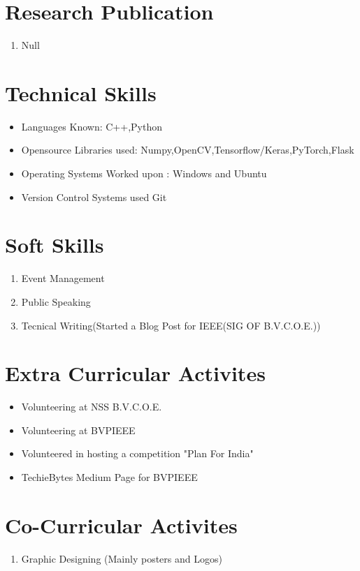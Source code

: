 \documentclass{my_cv}
\begin{document}
	\section{Research Publication}
	\begin{enumerate}
		\item Null
	\end{enumerate}
	\section{Technical Skills}
	\begin{itemize}
		\item Languages Known: C++,Python
		\item Opensource Libraries used: Numpy,OpenCV,Tensorflow/Keras,PyTorch,Flask
		\item Operating Systems Worked upon : Windows and Ubuntu
		\item Version Control Systems used Git
	\end{itemize}
	
	\section{Soft Skills}
	\begin{enumerate}
		\item Event Management
		\item Public Speaking
		\item Tecnical Writing(Started a Blog Post for IEEE(SIG OF B.V.C.O.E.))
	\end{enumerate}
	
	\section{Extra Curricular Activites}
		\begin{itemize}
			\item Volunteering at NSS B.V.C.O.E.
			\item Volunteering at BVPIEEE
			\item Volunteered in hosting a competition "Plan For India"
			\item TechieBytes Medium Page for BVPIEEE
		\end{itemize}
	\section{Co-Curricular Activites}
		\begin{enumerate}
			\item Graphic Designing (Mainly posters and Logos)
		\end{enumerate}
\end{document}
